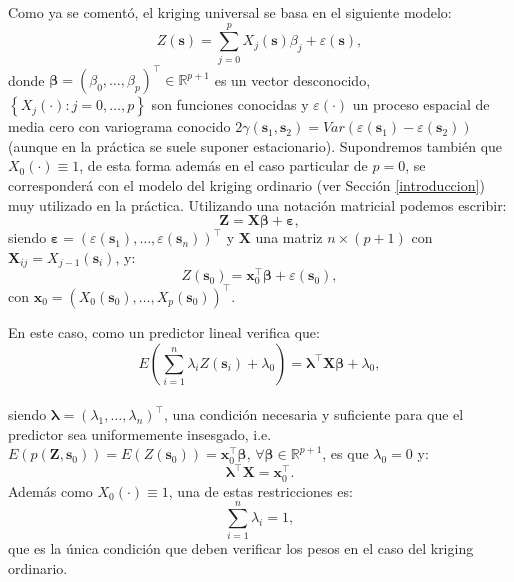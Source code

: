 \documentclass[
  spanish,
]{book}
\theoremstyle{break}
\theoremstyle{definition}
\theoremstyle{definition}
\theoremstyle{definition}
\theoremstyle{definition}
\theoremstyle{remark}
\begin{document}
Como ya se comentó, el kriging universal se basa en el siguiente modelo:
\[Z(\mathbf{s}) = \sum\limits_{j=0}^{p}X_{j}(\mathbf{s})\beta_{j} + \varepsilon(\mathbf{s}),\]
donde \(\boldsymbol{\beta}=(\beta_{0}, \ldots, \beta_{p})^\top \in \mathbb{R}^{p+1}\) es un vector desconocido, \(\left\{ X_{j}(\cdot):j=0, \ldots,p\right\}\) son funciones conocidas y \(\varepsilon(\cdot)\) un proceso espacial de media cero con variograma conocido \(2\gamma(\mathbf{s}_{1},\mathbf{s}_{2}) = Var(\varepsilon(\mathbf{s}_{1})-\varepsilon(\mathbf{s}_{2}))\) (aunque en la práctica se suele suponer estacionario).
Supondremos también que \(X_{0} (\cdot)\equiv 1\), de esta forma además en el caso particular de \(p=0\), se corresponderá con el modelo del kriging ordinario (ver Sección \ref{introduccion}) muy utilizado en la práctica.
Utilizando una notación matricial podemos escribir:
\[\mathbf{Z}=\mathbf{X}\boldsymbol{\beta}+\boldsymbol{\varepsilon},\]
siendo \(\boldsymbol{\varepsilon}=\left( \varepsilon(\mathbf{s}_{1}), \ldots, \varepsilon(\mathbf{s}_{n} )\right)^\top\) y \(\mathbf{X}\) una matriz \(n\times (p+1)\) con \(\mathbf{X}_{ij} =X_{j-1} (\mathbf{s}_{i})\), y:
\[Z(\mathbf{s}_{0})=\mathbf{x}_0^\top\boldsymbol{\beta}+\varepsilon(\mathbf{s}_{0}),\]
con \(\mathbf{x}_0=\left(X_{0}(\mathbf{s}_{0}), \ldots, X_{p}(\mathbf{s}_{0})\right)^\top\).

En este caso, como un predictor lineal verifica que:
\[E\left( \sum\limits_{i=1}^{n}\lambda_{i} Z(\mathbf{s}_{i}) +\lambda_{0} \right) = \boldsymbol{\lambda}^\top \mathbf{X}\boldsymbol{\beta}+\lambda_{0},\]\\
siendo \(\boldsymbol{\lambda}=\left( \lambda_{1}, \ldots,\lambda_{n} \right)^\top\), una condición necesaria y suficiente para que el predictor sea uniformemente insesgado, i.e.~\(E(p(\mathbf{Z},\mathbf{s}_{0}))=E(Z(\mathbf{s}_{0}))=\mathbf{x}_0^\top\boldsymbol{\beta}\), \(\forall \boldsymbol{\beta}\in \mathbb{R}^{p+1}\), es que \(\lambda_{0} =0\) y:
\begin{equation}
  \boldsymbol{\lambda}^\top \mathbf{X} = \mathbf{x}_0^\top.
  \label{eq:resticciones-ku}
\end{equation}
Además como \(X_{0} (\cdot)\equiv 1\), una de estas restricciones es:
\begin{equation}
  \sum\limits_{i=1}^{n}\lambda_{i} = 1,
  \label{eq:resticcion-ko}
\end{equation}
que es la única condición que deben verificar los pesos en el caso del kriging ordinario.
\end{document}

